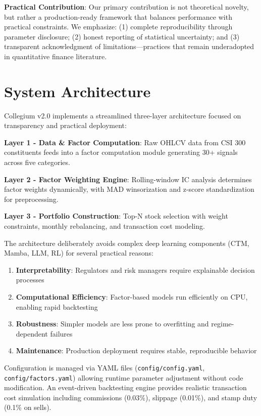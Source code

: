 \documentclass[12pt]{article}
\begin{document}
\textbf{Practical Contribution}: Our primary contribution is not theoretical novelty, but rather a production-ready framework that balances performance with practical constraints. We emphasize: (1) complete reproducibility through parameter disclosure; (2) honest reporting of statistical uncertainty; and (3) transparent acknowledgment of limitations---practices that remain underadopted in quantitative finance literature.

\section{System Architecture}

Collegium v2.0 implements a streamlined three-layer architecture focused on transparency and practical deployment:

\textbf{Layer 1 - Data \& Factor Computation}: Raw OHLCV data from CSI 300 constituents feeds into a factor computation module generating 30+ signals across five categories.

\textbf{Layer 2 - Factor Weighting Engine}: Rolling-window IC analysis determines factor weights dynamically, with MAD winsorization and z-score standardization for preprocessing.

\textbf{Layer 3 - Portfolio Construction}: Top-N stock selection with weight constraints, monthly rebalancing, and transaction cost modeling.

The architecture deliberately avoids complex deep learning components (CTM, Mamba, LLM, RL) for several practical reasons:
\begin{enumerate}
    \item \textbf{Interpretability}: Regulators and risk managers require explainable decision processes
    \item \textbf{Computational Efficiency}: Factor-based models run efficiently on CPU, enabling rapid backtesting
    \item \textbf{Robustness}: Simpler models are less prone to overfitting and regime-dependent failures
    \item \textbf{Maintenance}: Production deployment requires stable, reproducible behavior
\end{enumerate}

Configuration is managed via YAML files (\texttt{config/config.yaml}, \texttt{config/factors.yaml}) allowing runtime parameter adjustment without code modification. An event-driven backtesting engine provides realistic transaction cost simulation including commissions (0.03\%), slippage (0.01\%), and stamp duty (0.1\% on sells).
\end{document}
